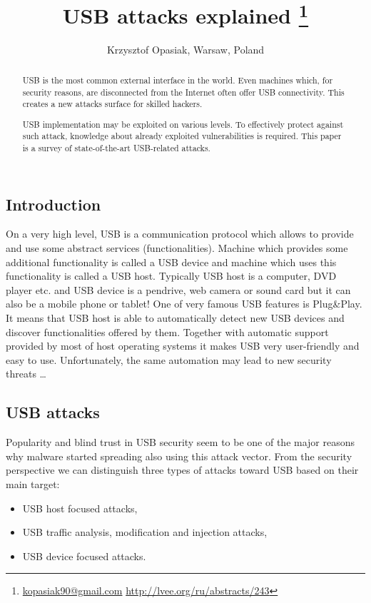 \documentclass[10pt, a5paper]{article}
\begin{document}
\title{USB attacks explained \footnote{\url{kopasiak90@gmail.com} \url{http://lvee.org/ru/abstracts/243}}}
\author{Krzysztof Opasiak, Warsaw, Poland}
\maketitle
\begin{abstract}
USB is the most common external interface in the world. Even machines which, for security reasons, are disconnected from the Internet often offer USB connectivity. This creates a new attacks surface for skilled hackers.

USB implementation may be exploited on various levels. To effectively protect against such attack, knowledge about already exploited vulnerabilities is required. This paper is a survey of state-of-the-art USB-related attacks.

\end{abstract}
\subsection*{Introduction}
On a very high level, USB is a communication protocol which allows to provide and use some abstract services (functionalities). Machine which provides some additional functionality is called a USB device and machine which uses this functionality is called a USB host. Typically USB host is a computer, DVD player etc. and USB device is a pendrive, web camera or sound card but it can also be a mobile phone or tablet!
One of very famous USB features is Plug\&Play. It means that USB host is able to automatically detect new USB devices and discover functionalities offered by them. Together with automatic support \linebreak provided by most of host operating systems it makes USB very user-friendly and easy to use. Unfortunately, the same automation may lead to new security threats \ldots{}
\subsection*{USB attacks}
Popularity and blind trust in USB security seem to be one of the major reasons why malware started spreading also using this attack vector. From the security perspective we can distinguish three types of attacks toward USB based on their main target:
\begin{itemize}
 \item USB host focused attacks,
 \item USB traffic analysis, modification and injection attacks,
 \item USB device focused attacks.
\end{itemize}
\end{document}
